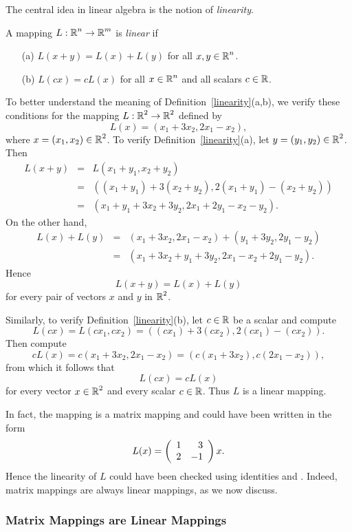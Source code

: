\documentclass{ximera}
\begin{document}
The central idea in linear algebra is the notion of
{\em linearity\/}. 
\begin{definition} \label{linearity}
A mapping $L:\mbox{$\Bbb{R}$}^n\to\mbox{$\Bbb{R}$}^m$ is {\em linear}
if
\begin{itemize}
\item[(a)]  $L(x+y) = L(x) + L(y)$ for all $x,y\in\mbox{$\Bbb{R}$}^n$.
\item[(b)]  $L(cx) = cL(x)$ for all $x\in\mbox{$\Bbb{R}$}^n$ and all scalars
$c\in\mbox{$\Bbb{R}$}$.
\end{itemize}
\end{definition}

To better understand the meaning of Definition~\ref{linearity}(a,b),
we verify these conditions for the mapping $L:\mbox{$\Bbb{R}$}^2\to\mbox{$\Bbb{R}$}^2$ defined by
\begin{equation}  \label{E:mme}
L(x) = (x_1+3x_2,2x_1-x_2),
\end{equation}
where $x=(x_1,x_2)\in\mbox{$\Bbb{R}$}^2$.  To verify Definition~\ref{linearity}(a), let
$y=(y_1,y_2)\in\mbox{$\Bbb{R}$}^2$.  Then
\begin{eqnarray*}
L(x+y) & = & L(x_1+y_1,x_2+y_2)\\
& = & ((x_1+y_1)+3(x_2+y_2), 2(x_1+y_1)-(x_2+y_2)) \\
 & = & (x_1+y_1+3x_2+3y_2, 2x_1+2y_1-x_2-y_2).
\end{eqnarray*}
On the other hand,
\begin{eqnarray*}
L(x)+L(y) & = & (x_1+3x_2,2x_1-x_2) + (y_1+3y_2,2y_1-y_2) \\
 & = & (x_1+3x_2+y_1+3y_2, 2x_1-x_2+2y_1-y_2).
\end{eqnarray*}
Hence
\[
L(x+y) = L(x) + L(y)
\]
for every pair of vectors $x$ and $y $ in $\mbox{$\Bbb{R}$}^2$.

Similarly, to verify Definition~\ref{linearity}(b), let $c\in\mbox{$\Bbb{R}$}$ be a scalar
and compute
\[
L(cx) = L(cx_1,cx_2)=((cx_1)+3(cx_2),2(cx_1)-(cx_2)).
\]
Then compute
\[
cL(x) = c(x_1+3x_2,2x_1-x_2)= (c(x_1+3x_2), c(2x_1-x_2)),
\]
from which it follows that
\[
L(cx) = cL(x)
\]
for every vector $x\in\mbox{$\Bbb{R}$}^2$ and every scalar $c\in\mbox{$\Bbb{R}$}$.  Thus $L$ is a linear 
mapping.

In fact, the mapping  is a matrix mapping and could
have been written in the form
\[
L(x) = \left(\begin{array}{rr} 1 & 3\\ 2 &-1\end{array}\right)x.
\]
Hence the linearity of $L$ could have been checked using identities
 and .  Indeed, matrix mappings are always linear
mappings, as we now discuss.

\subsubsection*{Matrix Mappings are Linear Mappings}
\end{document}
